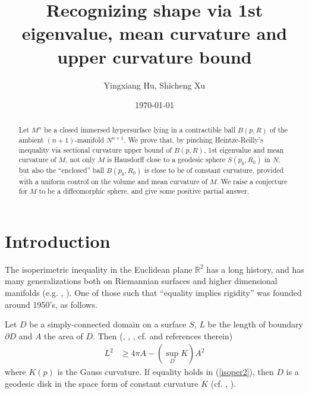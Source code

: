 \documentclass{amsart}
\numberwithin{equation}{section}
\theoremstyle{remark}
\renewcommand{\(}{\left(}
\renewcommand{\)}{\right)}
\renewcommand{\~}{\tilde}
\renewcommand{\-}{\overline}
\begin{document}
\title[Recognizing shape via 1st eigenvalue and mean curvature]{Recognizing shape via 1st eigenvalue, mean curvature and upper curvature bound}
\author{Yingxiang Hu, Shicheng Xu}

\address{Yau Mathematical Sciences Center, Tsinghua University, Beijing, China}

\address{School of Mathematical Sciences, Capital Normal University, Beijing, China \newline
\indent Academy for Multidisciplinary Studies, Capital Normal University, Beijing, China}
\date{\today}
\begin{abstract}
	Let $M^n$ be a closed immersed hypersurface lying in a contractible ball $B(p,R)$ of the ambient $(n+1)$-manifold $N^{n+1}$. We prove that, by pinching Heintze-Reilly's inequality via sectional curvature upper bound of $B(p,R)$, 1st eigenvalue and mean curvature of $M$, not only $M$ is Hausdorff close to a geodesic sphere $S(p_0,R_0)$ in $N$, but also the ``enclosed'' ball $B(p_0,R_0)$ is close to be of constant curvature, provided with a uniform control on the volume and mean curvature of $M$. We raise a conjecture for $M$ to be a diffeomorphic sphere, and give some positive partial answer.
\end{abstract}
{\maketitle}

\section{Introduction}

The isoperimetric inequality in the Euclidean plane $\mathbb R^2$ has a long history, and has many generalizations both on Riemannian surfaces and higher dimensional manifolds (e.g. \cite{Osserman1978}, \cite{Milman-Schechtman}). One of those such that ``equality implies rigidity'' was founded around 1950's, as follows.

Let $D$ be a simply-connected domain on a surface $S$, $L$ be the length of boundary $\partial D$ and $A$ the area of $D$. Then (\cite{Alexandrov1945,Alexandrov-Strel'tsov1965}, \cite{Huber1954}, \cite{Barbosa-doCarmo1978}, cf.  \cite{Osserman1978} and references therein)
\begin{align}
\label{isoper2}
L^2 &\ge 4\pi A-(\sup_D K)A^2
\end{align}
where $K(p)$ is the Gauss curvature. If equality holds in (\ref{isoper2}), then $D$ is a geodesic disk in the space form of constant curvature $K$ (cf. \cite{Barbosa-doCarmo1978}, \cite{Chavel-Feldman80}).
\end{document}
